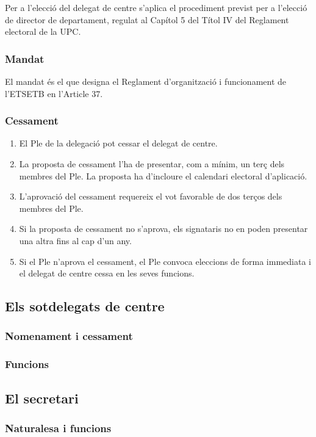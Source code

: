 \documentclass[a4paper,12pt]{article}
\renewcommand*{\thesubsubsection}{\arabic{subsubsection}}
\begin{document}
Per a l'elecció del delegat de centre s’aplica el procediment previst per a l'elecció de director de departament, regulat al Capítol 5 del Títol IV del Reglament electoral de la UPC.

\subsubsection{Mandat}
El mandat és el que designa el Reglament d’organització i funcionament de l'ETSETB en l'Article 37.

\subsubsection{Cessament}
\begin{enumerate}[\thesubsubsection.1]
	\item El Ple de la delegació pot cessar el delegat de centre.
	\item La proposta de cessament l'ha de presentar, com a mínim, un terç dels membres del Ple. La proposta ha d'incloure el calendari electoral d'aplicació.
	\item L'aprovació del cessament requereix el vot favorable de dos terços dels membres del Ple.
	\item Si la proposta de cessament no s'aprova, els signataris no en poden presentar una altra fins al cap d'un any.
	\item Si el Ple n'aprova el cessament, el Ple convoca eleccions de forma immediata i el delegat de centre cessa en les seves funcions.
\end{enumerate}


\subsection{Els sotdelegats de centre}
\subsubsection{Nomenament i cessament}
\subsubsection{Funcions}

\subsection{El secretari}
\subsubsection{Naturalesa i funcions}
\end{document}
